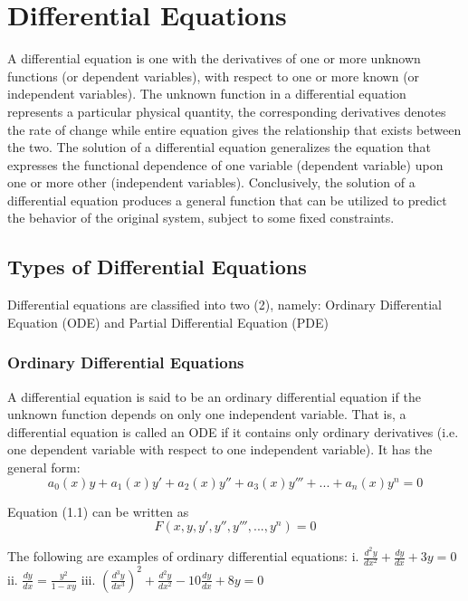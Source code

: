 \documentclass[12pt]{report}
\begin{document}
\section{Differential Equations}
\noindent A  differential equation is one with the derivatives of one or more unknown functions (or dependent variables), with respect to one or more known (or independent variables). The unknown function in a differential equation represents a particular physical quantity, the corresponding derivatives denotes the rate of change while entire equation gives the relationship that exists between the two. The solution of a differential equation generalizes the equation that expresses the functional dependence of one variable (dependent variable) upon one or more other (independent variables). Conclusively, the solution of a differential equation produces a general function that can be utilized to predict the behavior of the original system, subject to some fixed constraints. 
	
	\subsection{Types of Differential Equations}
	Differential equations are classified into two (2), namely: Ordinary Differential Equation (ODE) and Partial Differential Equation (PDE)

	\subsubsection{Ordinary Differential Equations}
		
	A differential equation is said to be an ordinary differential equation if the unknown function depends on only one independent variable. That is, a differential equation is called an ODE if it contains only ordinary derivatives (i.e. one dependent variable with respect to one independent variable). It has the general form: 
\begin{equation}
a_{0} (x)y+ a_{1} (x) y'+ a_{2} (x) y''+ a_{3} (x) y'''+...+ a_{n} (x) y^{n}=0
\end{equation}

Equation (1.1) can be written as 
\begin{equation}
F(x,y,y',y'',y''',...,y^{n})=0
\end{equation}

The following are examples of ordinary differential equations: 
i. $	\frac{d^{2} y}{dx^{2} }+  \frac{dy}{dx}+3y=0$ 
ii. $\frac{dy}{dx} = \frac{y^{2}}{1-xy} $  
iii. $(\frac{d^{3} y}{dx^{3} })^{2} + \frac{d^{2} y}{dx^{2} } - 10\frac{dy}{dx} +8y = 0 $
 
\end{document}
